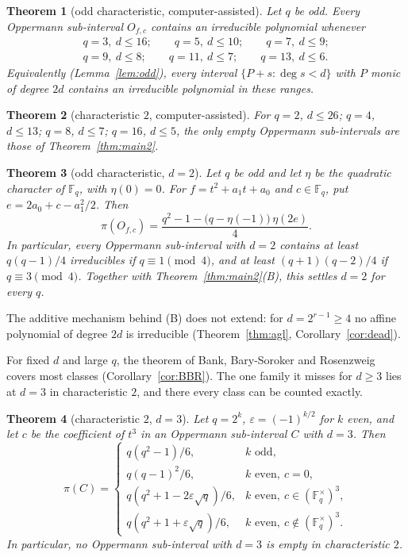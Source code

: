 \documentclass[11pt,a4paper]{amsart}
\newtheorem{theorem}{Theorem}[section]
\theoremstyle{definition}
\theoremstyle{remark}
\newcommand{\F}{\mathbb{F}}
\begin{document}
\begin{theorem}[odd characteristic, computer-assisted]\label{thm:odd}
Let $q$ be odd. Every Oppermann sub-interval $O_{f,c}$ contains an irreducible polynomial whenever
\[
\begin{gathered}q=3,\ d\le16;\qquad q=5,\ d\le10;\qquad q=7,\ d\le9;\\ q=9,\ d\le8;\qquad q=11,\ d\le7;\qquad q=13,\ d\le6.\end{gathered}
\]
Equivalently (Lemma~\ref{lem:odd}), every interval $\{P+s:\deg s<d\}$ with $P$ monic of degree $2d$ contains an
irreducible polynomial in these ranges.
\end{theorem}

\begin{theorem}[characteristic $2$, computer-assisted]\label{thm:even}
For $q=2$, $d\le26$; $q=4$, $d\le13$; $q=8$, $d\le7$; $q=16$, $d\le5$, the only empty Oppermann sub-intervals are
those of Theorem~\ref{thm:main2}.
\end{theorem}

\begin{theorem}[odd characteristic, $d=2$]\label{thm:odd2}
Let $q$ be odd and let $\eta$ be the quadratic character of $\F_q$, with $\eta(0)=0$. For $f=t^2+a_1t+a_0$ and
$c\in\F_q$, put $e=2a_0+c-a_1^2/2$. Then
\[
\pi(O_{f,c})=\frac{q^2-1-\bigl(q-\eta(-1)\bigr)\,\eta(2e)}{4}.
\]
In particular, every Oppermann sub-interval with $d=2$ contains at least $q(q-1)/4$ irreducibles if
$q\equiv1\pmod4$, and at least $(q+1)(q-2)/4$ if $q\equiv3\pmod4$. Together with Theorem~\ref{thm:main2}(B), this
settles $d=2$ for every $q$.
\end{theorem}

The additive mechanism behind (B) does not extend: for $d=2^{r-1}\ge4$ no affine polynomial of degree $2d$ is
irreducible (Theorem~\ref{thm:agl}, Corollary~\ref{cor:dead}).

For fixed $d$ and large $q$, the theorem of Bank, Bary-Soroker and Rosenzweig \cite{BBR} covers most classes
(Corollary~\ref{cor:BBR}). The one family it misses for $d\ge3$ lies at $d=3$ in characteristic $2$, and there every
class can be counted exactly.

\begin{theorem}[characteristic $2$, $d=3$]\label{thm:intro_p3zero}
Let $q=2^k$, $\varepsilon=(-1)^{k/2}$ for $k$ even, and let $c$ be the coefficient of $t^3$ in an Oppermann
sub-interval $C$ with $d=3$. Then
\[
\pi(C)=\begin{cases}
q(q^2-1)/6, & k\text{ odd},\\
q(q-1)^2/6, & k\text{ even},\ c=0,\\
q(q^2+1-2\varepsilon\sqrt q)/6, & k\text{ even},\ c\in(\F_q^\times)^3,\\
q(q^2+1+\varepsilon\sqrt q)/6, & k\text{ even},\ c\notin(\F_q^\times)^3.
\end{cases}
\]
In particular, no Oppermann sub-interval with $d=3$ is empty in characteristic $2$.
\end{theorem}
\end{document}
